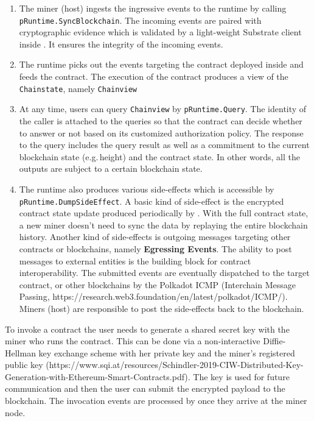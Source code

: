 \begin{enumerate}
    \item The miner (host) ingests the ingressive events to the runtime by calling \texttt{pRuntime.SyncBlockchain}. The incoming events are paired with cryptographic evidence which is validated by a light-weight Substrate client inside \pruntime. It ensures the integrity of the incoming events.
    \item The runtime picks out the events targeting the contract deployed inside and feeds the contract. The execution of the contract produces a view of the \texttt{Chainstate}, namely \texttt{Chainview}
    \item At any time, users can query \texttt{Chainview} by \texttt{pRuntime.Query}. The identity of the caller is attached to the queries so that the contract can decide whether to answer or not based on its customized authorization policy. The response to the query includes the query result as well as a commitment to the current blockchain state (e.g.\,height) and the contract state. In other words, all the outputs are subject to a certain blockchain state.
    \item The runtime also produces various side-effects which is accessible by \texttt{pRuntime.DumpSideEffect}. A basic kind of side-effect is the encrypted contract state update produced periodically by \pruntime. With the full contract state, a new miner doesn't need to sync the data by replaying the entire blockchain history. Another kind of side-effects is outgoing messages targeting other contracts or blockchains, namely \textbf{Egressing Events}. The ability to post messages to external entities is the building block for contract interoperability. The submitted events are eventually dispatched to the target contract, or other blockchains by the Polkadot ICMP (Interchain Message Passing, https://research.web3.foundation/en/latest/polkadot/ICMP/). Miners (host) are responsible to post the side-effects back to the blockchain.
\end{enumerate}

To invoke a contract the user needs to generate a shared secret key with the miner who runs the contract. This can be done via a non-interactive Diffie-Hellman key exchange scheme with her private key and the miner's registered public key (https://www.sqi.at/resources/Schindler-2019-CIW-Distributed-Key-Generation-with-Ethereum-Smart-Contracts.pdf). The key is used for future communication and then the user can submit the encrypted payload to the blockchain. The invocation events are processed by \pruntime once they arrive at the miner node.

